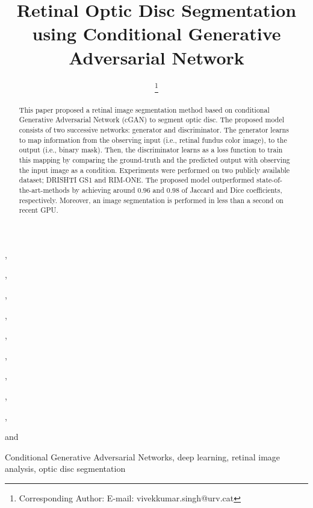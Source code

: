 \documentclass{IOS-Book-Article}
\def\hb{\hbox to 10.7 cm{}}
\begin{document}
\pagestyle{headings}
\def\thepage{}

\begin{frontmatter}              %


\title{Retinal Optic Disc Segmentation using Conditional Generative Adversarial Network}

\markboth{}{May 2018\hb}

\author[A]{ %
\thanks{Corresponding Author:  E-mail:
vivekkumar.singh@urv.cat}},
\author[A]{ },
\author[D]{ },
\author[B,C]{ },
\author[A]{ },
\author[A]{ },
\author[A]{ },
\author[A]{ },
\author[A]{ },
\author[A]{ }
and
\author[A]{ }
\address[A]{Department of Computer Engineering and Mathematics,  Universitat Rovira i Virgili, 43003 Tarragona, Spain.}
\address[B]{Kayakalp Hospital, 110084 New Delhi, India.}
\address[C]{Sant Joan de Reus University Hospital, 43204 Reus, Spain.}
\address[D]{Imaging Informatics Division, Bioinformatics Institute, 30 Biopolis Street, $\#$ 07-01 Matrix, 138671, Singapore.}

\begin{abstract}
This paper proposed a retinal image segmentation method based on conditional Generative Adversarial Network (cGAN) to segment optic disc. The proposed model consists of two successive networks: generator and discriminator. The generator learns to map information from the observing input (i.e., retinal fundus color image), to the output (i.e., binary mask). Then, the discriminator learns as a loss function to train this mapping by comparing the ground-truth and the predicted output with observing the input image as a condition. 
Experiments were performed on two publicly available dataset; DRISHTI GS1 and RIM-ONE. The proposed model outperformed state-of-the-art-methods by achieving around $0.96$ and $0.98$ of Jaccard and Dice coefficients, respectively. Moreover, an image segmentation is performed in less than a second on recent GPU.
\end{abstract}

\begin{keyword}
Conditional Generative Adversarial Networks, deep learning, retinal image analysis, optic disc segmentation
\end{keyword}
\end{frontmatter}
\markboth{May 2018\hb}{May 2018\hb}
\end{document}
